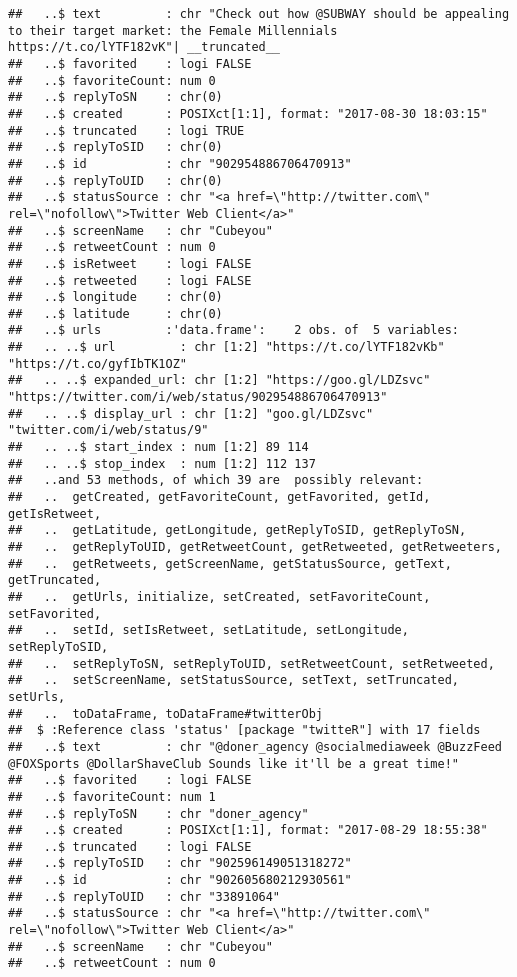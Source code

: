 \documentclass[]{article}
\begin{document}
\begin{verbatim}
##   ..$ text         : chr "Check out how @SUBWAY should be appealing to their target market: the Female Millennials https://t.co/lYTF182vK"| __truncated__
##   ..$ favorited    : logi FALSE
##   ..$ favoriteCount: num 0
##   ..$ replyToSN    : chr(0) 
##   ..$ created      : POSIXct[1:1], format: "2017-08-30 18:03:15"
##   ..$ truncated    : logi TRUE
##   ..$ replyToSID   : chr(0) 
##   ..$ id           : chr "902954886706470913"
##   ..$ replyToUID   : chr(0) 
##   ..$ statusSource : chr "<a href=\"http://twitter.com\" rel=\"nofollow\">Twitter Web Client</a>"
##   ..$ screenName   : chr "Cubeyou"
##   ..$ retweetCount : num 0
##   ..$ isRetweet    : logi FALSE
##   ..$ retweeted    : logi FALSE
##   ..$ longitude    : chr(0) 
##   ..$ latitude     : chr(0) 
##   ..$ urls         :'data.frame':    2 obs. of  5 variables:
##   .. ..$ url         : chr [1:2] "https://t.co/lYTF182vKb" "https://t.co/gyfIbTK1OZ"
##   .. ..$ expanded_url: chr [1:2] "https://goo.gl/LDZsvc" "https://twitter.com/i/web/status/902954886706470913"
##   .. ..$ display_url : chr [1:2] "goo.gl/LDZsvc" "twitter.com/i/web/status/9"
##   .. ..$ start_index : num [1:2] 89 114
##   .. ..$ stop_index  : num [1:2] 112 137
##   ..and 53 methods, of which 39 are  possibly relevant:
##   ..  getCreated, getFavoriteCount, getFavorited, getId, getIsRetweet,
##   ..  getLatitude, getLongitude, getReplyToSID, getReplyToSN,
##   ..  getReplyToUID, getRetweetCount, getRetweeted, getRetweeters,
##   ..  getRetweets, getScreenName, getStatusSource, getText, getTruncated,
##   ..  getUrls, initialize, setCreated, setFavoriteCount, setFavorited,
##   ..  setId, setIsRetweet, setLatitude, setLongitude, setReplyToSID,
##   ..  setReplyToSN, setReplyToUID, setRetweetCount, setRetweeted,
##   ..  setScreenName, setStatusSource, setText, setTruncated, setUrls,
##   ..  toDataFrame, toDataFrame#twitterObj
##  $ :Reference class 'status' [package "twitteR"] with 17 fields
##   ..$ text         : chr "@doner_agency @socialmediaweek @BuzzFeed @FOXSports @DollarShaveClub Sounds like it'll be a great time!"
##   ..$ favorited    : logi FALSE
##   ..$ favoriteCount: num 1
##   ..$ replyToSN    : chr "doner_agency"
##   ..$ created      : POSIXct[1:1], format: "2017-08-29 18:55:38"
##   ..$ truncated    : logi FALSE
##   ..$ replyToSID   : chr "902596149051318272"
##   ..$ id           : chr "902605680212930561"
##   ..$ replyToUID   : chr "33891064"
##   ..$ statusSource : chr "<a href=\"http://twitter.com\" rel=\"nofollow\">Twitter Web Client</a>"
##   ..$ screenName   : chr "Cubeyou"
##   ..$ retweetCount : num 0

\end{verbatim}
\end{document}
